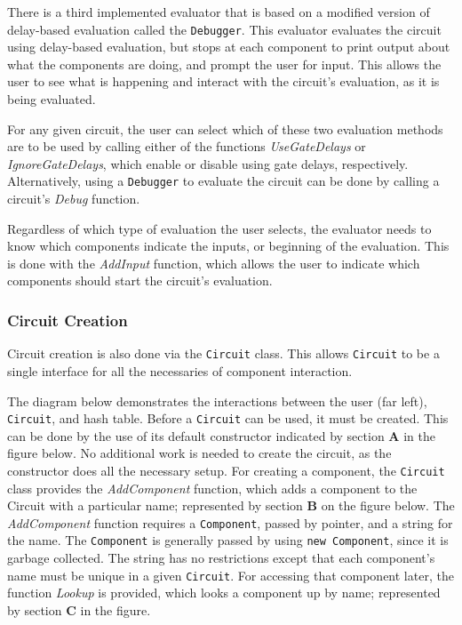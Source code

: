 \documentclass{article}
\newcommand{\Bold}[1]{\textbf{#1}}
\newcommand{\ClassName}[1]{\texttt{#1}}
\newcommand{\FunctionName}[1]{\textit{#1}}
\begin{document}
There is a third implemented evaluator that is based on a modified version of delay-based evaluation called the \ClassName{Debugger}. This evaluator evaluates the circuit using delay-based evaluation, but stops at each component to print output about what the components are doing, and prompt the user for input. This allows the user to see what is happening and interact with the circuit’s evaluation, as it is being evaluated.

For any given circuit, the user can select which of these two evaluation methods are to be used by calling either of the functions \FunctionName{UseGateDelays} or \FunctionName{IgnoreGateDelays}, which enable or disable using gate delays, respectively. Alternatively, using a \ClassName{Debugger} to evaluate the circuit can be done by calling a circuit’s \FunctionName{Debug} function.

Regardless of which type of evaluation the user selects, the evaluator needs to know which components indicate the inputs, or beginning of the evaluation. This is done with the \FunctionName{AddInput} function, which allows the user to indicate which components should start the circuit’s evaluation.

\subsubsection{Circuit Creation}

Circuit creation is also done via the \ClassName{Circuit} class. This allows \ClassName{Circuit} to be a single interface for all the necessaries of component interaction.

The diagram below demonstrates the interactions between the user (far left), \ClassName{Circuit}, and hash table. Before a \ClassName{Circuit} can be used, it must be created. This can be done by the use of its default constructor indicated by section \Bold{A} in the figure below. No additional work is needed to create the circuit, as the constructor does all the necessary setup. For creating a component, the \ClassName{Circuit} class provides the \FunctionName{AddComponent} function, which adds a component to the Circuit with a particular name; represented by section \Bold{B} on the figure below. The \FunctionName{AddComponent} function requires a \ClassName{Component}, passed by pointer, and a string for the name. The \ClassName{Component} is generally passed by using \ClassName{new Component}, since it is garbage collected. The string has no restrictions except that each component’s name must be unique in a given \ClassName{Circuit}. For accessing that component later, the function \FunctionName{Lookup} is
provided, which looks a component up by name; represented by section \Bold{C} in the figure.
\end{document}

